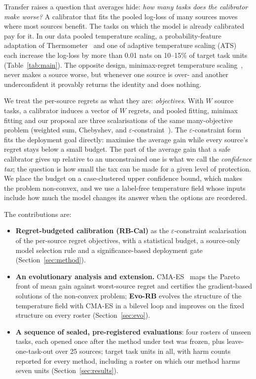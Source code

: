 \documentclass[runningheads]{llncs}
\begin{document}
Transfer raises a question that averages hide: \emph{how many tasks does the calibrator make worse?}
A calibrator that fits the pooled log-loss of many sources moves where most sources benefit.
The tasks on which the model is already calibrated pay for it.
In our data pooled temperature scaling, a probability-feature adaptation of Thermometer~\cite{shen2024thermometer} and one of adaptive temperature scaling (ATS)~\cite{xie2024ats} each increase the log-loss by more than 0.01 nats on 10--15\% of target task units (Table~\ref{tab:main}).
The opposite design, minimax-regret temperature scaling~\cite{calport2026}, never makes a source worse, but whenever one source is over- and another underconfident it provably returns the identity and does nothing.

We treat the per-source regrets as what they are: \emph{objectives}.
With $W$ source tasks, a calibrator induces a vector of $W$ regrets, and pooled fitting, minimax fitting and our proposal are three scalarisations of the same many-objective problem (weighted sum, Chebyshev, and $\varepsilon$-constraint~\cite{miettinen1999nonlinear}).
The $\varepsilon$-constraint form fits the deployment goal directly: maximise the average gain while every source's regret stays below a small budget.
The part of the average gain that a safe calibrator gives up relative to an unconstrained one is what we call the \emph{confidence tax}; the question is how small the tax can be made for a given level of protection.
We place the budget on a case-clustered upper confidence bound, which makes the problem non-convex, and we use a label-free temperature field whose inputs include how much the model changes its answer when the options are reordered.

The contributions are:
\begin{itemize}
\item \textbf{Regret-budgeted calibration (RB-Cal)} as the $\varepsilon$-constraint scalarisation of the per-source regret objectives, with a statistical budget, a source-only model selection rule and a significance-based deployment gate (Section~\ref{sec:method}).
\item \textbf{An evolutionary analysis and extension.} CMA-ES~\cite{hansen2001cma} maps the Pareto front of mean gain against worst-source regret and certifies the gradient-based solutions of the non-convex problem; \textbf{Evo-RB} evolves the structure of the temperature field with CMA-ES in a bilevel loop and improves on the fixed structure on every roster (Section~\ref{sec:evo}).
\item \textbf{A sequence of sealed, pre-registered evaluations}: four rosters of unseen tasks, each opened once after the method under test was frozen, plus leave-one-task-out over 25 sources; \NTotal{} target task units in all, with harm counts reported for every method, including a roster on which our method harms seven units (Section~\ref{sec:results}).
\end{itemize}
\end{document}
